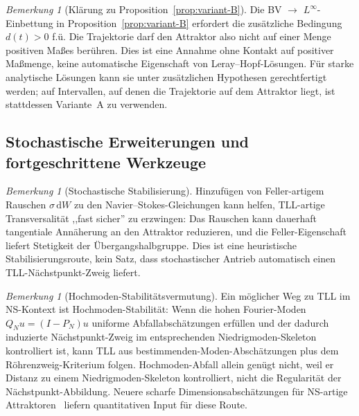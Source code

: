 \documentclass[12pt,a4paper]{article}
\theoremstyle{definition}
\theoremstyle{plain}
\theoremstyle{remark}
\newtheorem{remark}[definition]{Bemerkung}
\begin{document}
\begin{remark}[Klärung zu Proposition~\ref{prop:variant-B}]
\label{rem:prop-variant-B-clarification}
Die BV $\to$ $L^\infty$-Einbettung in Proposition~\ref{prop:variant-B} erfordert die zusätzliche Bedingung $d(t) > 0$ f.ü. Die Trajektorie darf den Attraktor also nicht auf einer Menge positiven Maßes berühren. Dies ist eine Annahme ohne Kontakt auf positiver Maßmenge, keine automatische Eigenschaft von Leray--Hopf-Lösungen. Für starke analytische Lösungen kann sie unter zusätzlichen Hypothesen gerechtfertigt werden; auf Intervallen, auf denen die Trajektorie auf dem Attraktor liegt, ist stattdessen Variante~A zu verwenden.
\end{remark}

\subsection{Stochastische Erweiterungen und fortgeschrittene Werkzeuge}

\begin{remark}[Stochastische Stabilisierung]
\label{rem:stochastic-stabilisation}
Hinzufügen von Feller-artigem Rauschen $\sigma\,\mathrm{d}W$ zu den Navier--Stokes-Gleichungen kann helfen, TLL-artige Transversalität ,,fast sicher'' zu erzwingen: Das Rauschen kann dauerhaft tangentiale Annäherung an den Attraktor reduzieren, und die Feller-Eigenschaft liefert Stetigkeit der Übergangshalbgruppe. Dies ist eine heuristische Stabilisierungsroute, kein Satz, dass stochastischer Antrieb automatisch einen TLL-Nächstpunkt-Zweig liefert.
\end{remark}

\begin{remark}[Hochmoden-Stabilitätsvermutung]
\label{rem:high-mode-stability}
Ein möglicher Weg zu TLL im NS-Kontext ist Hochmoden-Stabilität: Wenn die hohen Fourier-Moden $Q_N u = (I - P_N)u$ uniforme Abfallabschätzungen erfüllen und der dadurch induzierte Nächstpunkt-Zweig im entsprechenden Niedrigmoden-Skeleton kontrolliert ist, kann TLL aus bestimmenden-Moden-Abschätzungen plus dem Röhrenzweig-Kriterium folgen. Hochmoden-Abfall allein genügt nicht, weil er Distanz zu einem Niedrigmoden-Skeleton kontrolliert, nicht die Regularität der Nächstpunkt-Abbildung. Neuere scharfe Dimensionsabschätzungen für NS-artige Attraktoren~\cite{IlyinKalantarovZelik2025} liefern quantitativen Input für diese Route.
\end{remark}
\end{document}
